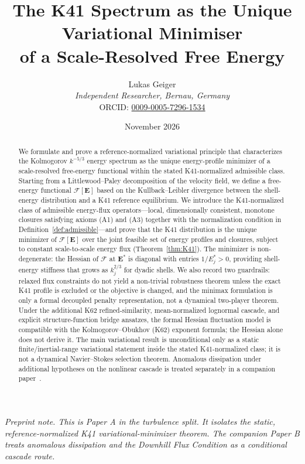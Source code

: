 \documentclass[12pt,a4paper]{article}
\title{The K41 Spectrum as the Unique Variational Minimiser\\
of a Scale-Resolved Free Energy}
\author{Lukas Geiger\\
\textit{Independent Researcher, Bernau, Germany}\\
ORCID: \href{https://orcid.org/0009-0005-7296-1534}{0009-0005-7296-1534}}
\date{November 2026}
\theoremstyle{definition}
\theoremstyle{plain}
\theoremstyle{remark}
\begin{document}
\maketitle

\begin{abstract}
We formulate and prove a reference-normalized variational principle that characterizes
the Kolmogorov $k^{-5/3}$ energy spectrum as the unique energy-profile
minimizer of a scale-resolved free-energy functional within the stated
K41-normalized admissible class.  Starting from a
Littlewood--Paley decomposition of the velocity field, we define a
free-energy functional $\mathcal{F}[\mathbf{E}]$ based on the
Kullback--Leibler divergence between the shell-energy distribution and a
K41 reference equilibrium.  We introduce the K41-normalized class of
admissible energy-flux operators---local, dimensionally consistent,
monotone closures satisfying axioms (A1) and (A3) together with the
normalization condition in Definition~\ref{def:admissible}---and prove
that the K41 distribution is the unique minimizer of
$\mathcal{F}[\mathbf{E}]$ over the joint feasible set of energy profiles
and closures, subject to constant scale-to-scale energy flux
(Theorem~\ref{thm:K41}).  The
minimizer is non-degenerate: the Hessian of $\mathcal{F}$ at
$\mathbf{E}^*$ is diagonal with entries $1/E_j^* > 0$, providing
  shell-energy stiffness that grows as $k_j^{2/3}$ for dyadic shells.  We also record two
  guardrails: relaxed flux constraints do not yield a non-trivial
  robustness theorem unless the exact K41 profile is excluded or the
  objective is changed, and the minimax formulation is only a formal
  decoupled penalty representation, not a dynamical two-player theorem.
Under the additional K62 refined-similarity, mean-normalized lognormal
cascade, and explicit structure-function bridge ansatzes, the formal Hessian fluctuation model is compatible with the
Kolmogorov--Obukhov (K62) exponent formula; the Hessian alone does not
derive it.  The main variational result is unconditional
only as a static finite/inertial-range variational statement inside the
stated K41-normalized class; it is not a dynamical Navier--Stokes
selection theorem.  Anomalous dissipation under additional hypotheses on
the nonlinear cascade is treated separately in a companion
paper~\cite{Geiger2026b}.
\end{abstract}

\begin{center}
\small\emph{Preprint note. This is Paper A in the turbulence split. It isolates the static, reference-normalized K41 variational-minimizer theorem. The companion Paper B treats anomalous dissipation and the Downhill Flux Condition as a conditional cascade route.}
\end{center}
\clearpage
\end{document}
